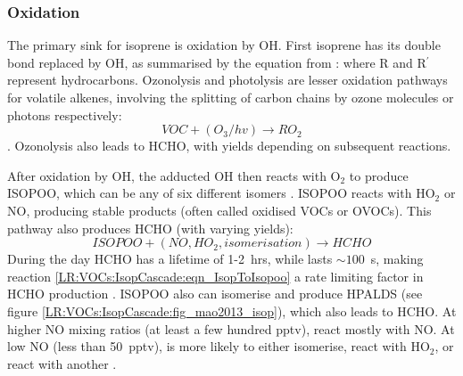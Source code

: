     \subsubsection{Oxidation}
      \label{LR:VOCs:IsopCascade:Oxidation}
      The primary sink for isoprene is oxidation by OH.
      First isoprene has its double bond replaced by OH, as summarised by the equation from \textcite{Patchen2007}:
      where R and R$^{\prime}$ represent hydrocarbons.
      Ozonolysis and photolysis are lesser oxidation pathways for volatile alkenes, involving the splitting of carbon chains by ozone molecules or photons respectively:
      \begin{equation}
        VOC + (O_3/hv) \rightarrow RO_2
      \end{equation}
      \parencite{Nguyen2016,Wolfe2016}.
      Ozonolysis also leads to HCHO, with yields depending on subsequent reactions.
      
      After oxidation by OH, the adducted OH then reacts with O$_2$ to produce ISOPOO, which can be any of six different isomers \parencite{Patchen2007}.
      ISOPOO reacts with HO$_2$ or NO, producing stable products (often called oxidised VOCs or OVOCs).
      This pathway also produces HCHO (with varying yields):
      \begin{equation}
        ISOPOO + (NO, HO_2, isomerisation) \rightarrow HCHO 
      \end{equation}
      During the day HCHO has a lifetime of 1-2~hrs, while \roo lasts $\sim 100$~s, making reaction \ref{LR:VOCs:IsopCascade:eqn_IsopToIsopoo} a rate limiting factor in HCHO production \parencite{Wolfe2016}.
      ISOPOO also can isomerise and produce HPALDS (see figure \ref{LR:VOCs:IsopCascade:fig_mao2013_isop}), which also leads to HCHO.
      At higher NO mixing ratios (at least a few hundred pptv), \roo react mostly with NO. 
      At low NO (less than 50~pptv), \roo is more likely to either isomerise, react with HO$_2$, or react with another \roo.
      
      
      

